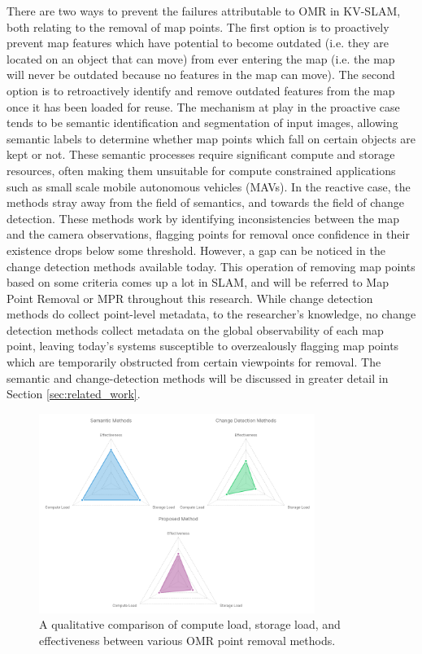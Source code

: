 There are two ways to prevent the failures attributable to OMR in KV-SLAM, both relating to the removal of map points. The first option is to proactively prevent map features which have potential to become outdated (i.e. they are located on an object that can move) from ever entering the map (i.e. the map will never be outdated because no features in the map can move). The second option is to retroactively identify and remove outdated features from the map once it has been loaded for reuse. The mechanism at play in the proactive case tends to be semantic identification and segmentation of input images, allowing semantic labels to determine whether map points which fall on certain objects are kept or not. These semantic processes require significant compute and storage resources, often making them unsuitable for compute constrained applications such as small scale mobile autonomous vehicles (MAVs). In the reactive case, the methods stray away from the field of semantics, and towards the field of change detection. These methods work by identifying inconsistencies between the map and the camera observations, flagging points for removal once confidence in their existence drops below some threshold. However, a gap can be noticed in the change detection methods available today. This operation of removing map points based on some criteria comes up a lot in SLAM, and will be referred to Map Point Removal or MPR throughout this research. While change detection methods do collect point-level metadata, to the researcher's knowledge, no change detection methods collect metadata on the global observability of each map point, leaving today's systems susceptible to overzealously flagging map points which are temporarily obstructed from certain viewpoints for removal. The semantic and change-detection methods will be discussed in greater detail in Section \ref{sec:related_work}.

\begin{figure}[h!]
    \centering
    \includegraphics[width=0.8\textwidth]{resources/omr_method_comparison.png}
    \caption[OMR Method Comparison]{A qualitative comparison of compute load, storage load, and effectiveness between various OMR point removal methods.}
    \label{fig:omr_method_comparison}
\end{figure}


